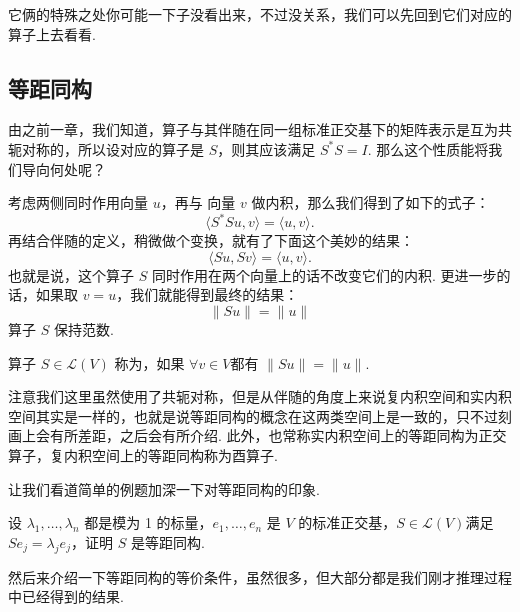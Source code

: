 它俩的特殊之处你可能一下子没看出来，不过没关系，我们可以先回到它们对应的算子上去看看.

\subsection{等距同构}

由之前一章，我们知道，算子与其伴随在同一组标准正交基下的矩阵表示是互为共轭对称的，所以设对应的算子是 $ S $，则其应该满足 $ S^*S = I $. 那么这个性质能将我们导向何处呢？

考虑两侧同时作用向量 $ u $，再与 向量 $ v $ 做内积，那么我们得到了如下的式子：
\[ \langle S^*Su, v \rangle = \langle u, v \rangle. \]
再结合伴随的定义，稍微做个变换，就有了下面这个美妙的结果：
\[ \langle Su, Sv \rangle = \langle u, v \rangle. \]
也就是说，这个算子 $ S $ 同时作用在两个向量上的话不改变它们的内积. 更进一步的话，如果取 $ v = u $，我们就能得到最终的结果：
\[ \lVert Su \rVert = \lVert u \rVert \]
算子 $ S $ 保持范数.

\begin{definition}[等距同构] 
    算子 $ S \in \mathcal{L}(V) $ 称为，如果 $ \forall v \in V $都有 $ \lVert Su \rVert = \lVert u \rVert $.
\end{definition}

注意我们这里虽然使用了共轭对称，但是从伴随的角度上来说复内积空间和实内积空间其实是一样的，也就是说等距同构的概念在这两类空间上是一致的，只不过刻画上会有所差距，之后会有所介绍. 此外，也常称实内积空间上的等距同构为正交算子，复内积空间上的等距同构称为酉算子.

让我们看道简单的例题加深一下对等距同构的印象.
\begin{example} \label{ex:25:等距同构}
    设 $ \lambda_1, \ldots , \lambda_n $ 都是模为 1 的标量，$ e_1, \ldots , e_n $ 是 $ V $ 的标准正交基，$ S \in \mathcal{L}(V) $满足 $ Se_j = \lambda_je_j $，证明 $ S $ 是等距同构.
\end{example}

然后来介绍一下等距同构的等价条件，虽然很多，但大部分都是我们刚才推理过程中已经得到的结果.

